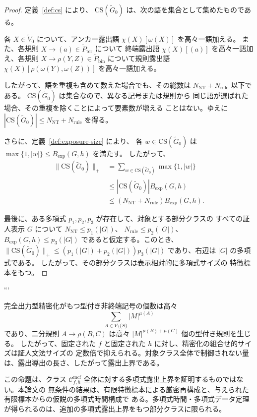 \documentclass[11pt,a4paper]{ltjsarticle}
\theoremstyle{remark}
\newcommand{\CS}{\mathrm{CS}}
\newcommand{\Cmcf}[2]{\mathcal{C}^{\mathrm{mcf}}_{#1,#2}}
\begin{document}
\begin{proof}
定義~\ref{def:cs} により、
\(\CS(\widetilde G_0)\) は、次の語を集合として集めたものである。

各 \(X\in\widetilde V_0\) について、アンカー露出語
\(\chi(X)[\omega(X)]\) を高々一語加える。
また、各規則 \(X\to(a)\in\widetilde P_{\mathrm{ter}}\) について
終端露出語 \(\chi(X)[(a)]\) を高々一語加え、各規則
\(X\to\rho(Y,Z)\in\widetilde P_{\mathrm{bin}}\) について規則露出語
\(\chi(X)[\rho(\omega(Y),\omega(Z))]\) を高々一語加える。

したがって、語を重複も含めて数えた場合でも、その総数は
\(N_{\mathrm{NT}}+N_{\mathrm{rule}}\) 以下である。
\(\CS(\widetilde G_0)\) は集合なので、異なる記号または規則から
同じ語が選ばれた場合、その重複を除くことによって要素数が増える
ことはない。ゆえに
\(|\CS(\widetilde G_0)|
 \le N_{\mathrm{NT}}+N_{\mathrm{rule}}\)
を得る。

さらに、定義~\ref{def:exposure-size} により、
各 \(w\in\CS(\widetilde G_0)\) は
\(\max\{1,|w|\}\le B_{\mathrm{exp}}(G,h)\) を満たす。
したがって、
\[
\begin{aligned}
  \|\CS(\widetilde G_0)\|_+
  &=
  \sum_{w\in\CS(\widetilde G_0)}\max\{1,|w|\}\\
  &\le
  |\CS(\widetilde G_0)|B_{\mathrm{exp}}(G,h)\\
  &\le
  (N_{\mathrm{NT}}+N_{\mathrm{rule}})
  B_{\mathrm{exp}}(G,h).
\end{aligned}
\]

最後に、ある多項式 \(p_1,p_2,p_3\) が存在して、対象とする部分クラスの
すべての証人表示 \(G\) について
\(N_{\mathrm{NT}}\le p_1(|G|)\)、
\(N_{\mathrm{rule}}\le p_2(|G|)\)、
\(B_{\mathrm{exp}}(G,h)\le p_3(|G|)\)
であると仮定する。このとき、
\(\|\CS(\widetilde G_0)\|_+
 \le (p_1(|G|)+p_2(|G|))p_3(|G|)\)
であり、右辺は \(|G|\) の多項式である。
したがって、その部分クラスは表示相対的に多項式サイズの
特徴標本をもつ。
\end{proof}
```




完全出力型精密化がもつ型付き非終端記号の個数は高々
\[
  \sum_{A\in V\setminus\{S\}} |M|^{\mu(A)}
\]
であり、二分規則 \(A\to\rho(B,C)\) は高々 \(|M|^{\mu(B)+\mu(C)}\) 個の型付き規則を生じる。
したがって、固定された \(f\) と固定された \(h\) に対し、精密化の組合せ的サイズは証人文法サイズの
定数倍で抑えられる。対象クラス全体で制御されない量は、露出導出の長さ、したがって露出上界である。

この命題は、クラス \(\Cmcf{f}{h}\) 全体に対する多項式露出上界を証明するものではない。本論文の
無条件の結果は、有限特徴標本による厳密再構成と、与えられた有限標本からの仮説の多項式時間構成で
ある。多項式時間・多項式データ定理が得られるのは、追加の多項式露出上界をもつ部分クラスに限られる。
\end{document}
